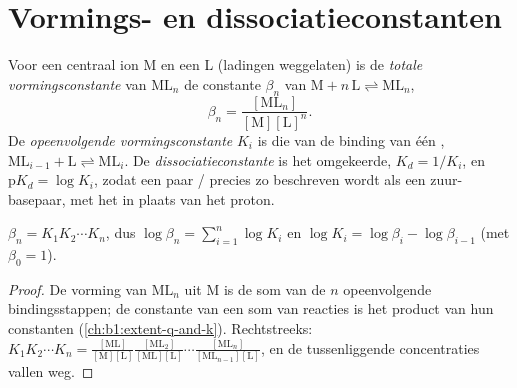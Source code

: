 \section{Vormings- en dissociatieconstanten}

\begin{definition}\label{def:b1:complexation:formation-constant}
Voor een centraal ion M en een  L (ladingen weggelaten) is de
\emph{totale vormingsconstante} van
$\mathrm{ML}_n$ de constante $\beta_n$ van
$\mathrm{M} + n\,\mathrm{L} \rightleftharpoons \mathrm{ML}_n$,
\[
  \beta_n = \frac{[\mathrm{ML}_n]}{[\mathrm{M}][\mathrm{L}]^n} .
\]
De \emph{opeenvolgende vormingsconstante}
$K_i$ is die van de binding van één ,
$\mathrm{ML}_{i-1} + \mathrm{L} \rightleftharpoons \mathrm{ML}_i$. De
\emph{dissociatieconstante} is het
omgekeerde, $K_d = 1/K_i$, en $\mathrm{p}K_d = \log K_i$, zodat een paar
/ precies zo beschreven wordt als een zuur-basepaar, met het
 in plaats van het proton.
\end{definition}

\begin{proposition}\label{prop:b1:complexation:beta-k}
$\beta_n = K_1 K_2 \cdots K_n$, dus
$\log\beta_n = \sum_{i=1}^n \log K_i$ en $\log K_i = \log\beta_i -
\log\beta_{i-1}$ (met $\beta_0 = 1$).
\end{proposition}

\begin{proof}
De vorming van $\mathrm{ML}_n$ uit M is de som van de $n$ opeenvolgende
bindingsstappen; de constante van een som van reacties is het product
van hun constanten (\cref{ch:b1:extent-q-and-k}). Rechtstreeks:
$K_1 K_2\cdots K_n = \frac{[\mathrm{ML}]}{[\mathrm{M}][\mathrm{L}]}
\frac{[\mathrm{ML_2}]}{[\mathrm{ML}][\mathrm{L}]}\cdots
\frac{[\mathrm{ML}_n]}{[\mathrm{ML}_{n-1}][\mathrm{L}]}$, en de
tussenliggende concentraties vallen weg.
\end{proof}

